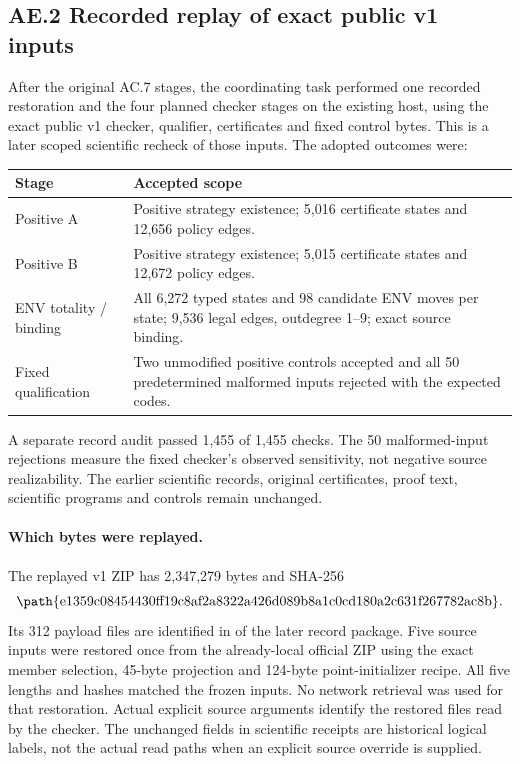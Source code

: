 \subsection*{AE.2 Recorded replay of exact public v1 inputs}
\label{supp:r7-exact-public-replay}
After the original AC.7 stages, the coordinating task performed one
recorded restoration and the four planned checker stages on the existing
host, using the exact public v1 checker, qualifier, certificates and
fixed control bytes. This is a later scoped scientific recheck of
those inputs. The adopted outcomes were:
\begin{center}\small
\begin{tabular}{@{}L{37mm}L{109mm}@{}}\toprule
Stage & Accepted scope\\\midrule
Positive A & Positive strategy existence; 5,016 certificate states and 12,656 policy edges.\\
Positive B & Positive strategy existence; 5,015 certificate states and 12,672 policy edges.\\
ENV totality / binding & All 6,272 typed states and 98 candidate ENV moves per state; 9,536 legal edges, outdegree 1--9; exact source binding.\\
Fixed qualification & Two unmodified positive controls accepted and all 50 predetermined malformed inputs rejected with the expected codes.\\\bottomrule
\end{tabular}
\end{center}
A separate record audit passed 1,455 of 1,455 checks. The 50 malformed-input
rejections measure the fixed checker's observed sensitivity, not negative
source realizability. The earlier scientific records, original certificates,
proof text, scientific programs and controls remain unchanged.

\paragraph{Which bytes were replayed.}
The replayed v1 ZIP has 2,347,279 bytes and SHA-256
\[
\text{\path{e1359c08454430ff19c8af2a8322a426d089b8a1c0cd180a2c631f267782ac8b}} .
\]
Its 312 payload files are identified in
 of the later record package.
Five source inputs were restored once from the already-local official ZIP
using the exact member selection, 45-byte projection and 124-byte
point-initializer recipe. All five lengths and hashes matched the frozen
inputs. No network retrieval was used for that restoration.
Actual explicit source arguments identify the restored files read by the
checker. The unchanged  fields in scientific receipts are
historical logical labels, not the actual read paths when an explicit source
override is supplied.

